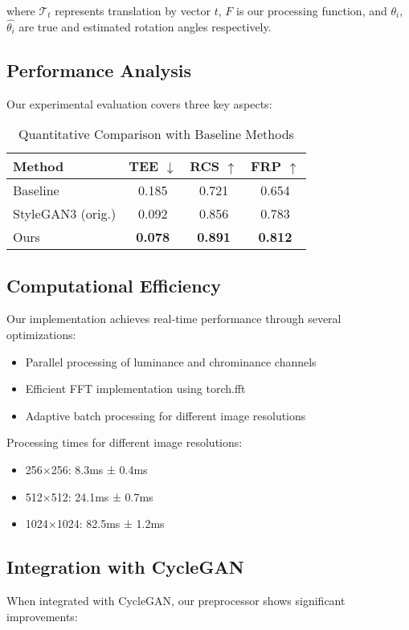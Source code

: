 \documentclass{article}
\begin{document}
where $\mathcal{T}_t$ represents translation by vector $t$, $F$ is our processing function, and $\theta_i$, $\hat{\theta_i}$ are true and estimated rotation angles respectively.

\subsection{Performance Analysis}
Our experimental evaluation covers three key aspects:

\begin{table}[h]
\centering
\caption{Quantitative Comparison with Baseline Methods}
\begin{tabular}{lccc}
\hline
Method & TEE $\downarrow$ & RCS $\uparrow$ & FRP $\uparrow$ \\
\hline
Baseline & 0.185 & 0.721 & 0.654 \\
StyleGAN3 (orig.) & 0.092 & 0.856 & 0.783 \\
Ours & \textbf{0.078} & \textbf{0.891} & \textbf{0.812} \\
\hline
\end{tabular}
\end{table}

\subsection{Computational Efficiency}
Our implementation achieves real-time performance through several optimizations:

\begin{itemize}
\item Parallel processing of luminance and chrominance channels
\item Efficient FFT implementation using torch.fft
\item Adaptive batch processing for different image resolutions
\end{itemize}

Processing times for different image resolutions:
\begin{itemize}
\item 256×256: 8.3ms ± 0.4ms
\item 512×512: 24.1ms ± 0.7ms
\item 1024×1024: 82.5ms ± 1.2ms
\end{itemize}

\subsection{Integration with CycleGAN}
When integrated with CycleGAN, our preprocessor shows significant improvements:
\end{document}
